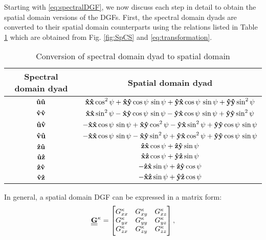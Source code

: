 \documentclass[12pt]{article}
\begin{document}
Starting with \eqref{eq:spectralDGF}, we now discuss each step in detail to obtain the spatial domain versions of the DGFs. First, the spectral domain dyads are converted to their spatial domain counterparts using the relations listed in Table \ref{tab:dyad_conversion} which are obtained from Fig. \ref{fig:SpCS} and \eqref{eq:transformation}.
%
\begin{table}[!ht]
  \begin{center}
    \begin{tabular}{|| c | c ||}
      \hline
      Spectral domain dyad & Spatial domain dyad \\ [0.5ex]
      \hline\hline
      $\mathbf{\hat u} \mathbf{\hat u}$ & $ \displaystyle \mathbf{\hat x} \mathbf{\hat x} \cos^2 \psi + \mathbf{\hat x} \mathbf{\hat y} \cos \psi \, \sin \psi + \mathbf{\hat y} \mathbf{\hat x} \cos \psi \, \sin \psi + \mathbf{\hat y} \mathbf{\hat y} \sin^2 \psi$ \\ [2.5ex]
      $\mathbf{\hat v} \mathbf{\hat v}$ & $ \displaystyle \mathbf{\hat x} \mathbf{\hat x} \sin^2 \psi - \mathbf{\hat x} \mathbf{\hat y} \cos \psi \, \sin \psi - \mathbf{\hat y} \mathbf{\hat x} \cos \psi \, \sin \psi + \mathbf{\hat y} \mathbf{\hat y} \sin^2 \psi$ \\ [2.5ex]
      $\mathbf{\hat u} \mathbf{\hat v}$ & $ \displaystyle -\mathbf{\hat x} \mathbf{\hat x} \cos \psi \, \sin \psi + \mathbf{\hat x} \mathbf{\hat y} \cos^2 \psi - \mathbf{\hat y} \mathbf{\hat x} \sin^2 \psi + \mathbf{\hat y} \mathbf{\hat y} \cos \psi \, \sin \psi$ \\ [2.5ex]
      $\mathbf{\hat v} \mathbf{\hat u}$ & $ \displaystyle -\mathbf{\hat x} \mathbf{\hat x} \cos \psi \, \sin \psi - \mathbf{\hat x} \mathbf{\hat y} \sin^2 \psi + \mathbf{\hat y} \mathbf{\hat x} \cos^2 \psi + \mathbf{\hat y} \mathbf{\hat y} \cos \psi \, \sin \psi$ \\ [2.5ex]
      $\mathbf{\hat z} \mathbf{\hat u}$ & $ \displaystyle \mathbf{\hat z} \mathbf{\hat x} \cos \psi + \mathbf{\hat z} \mathbf{\hat y} \sin \psi$ \\ [2.5ex]
      $\mathbf{\hat u} \mathbf{\hat z}$ & $ \displaystyle \mathbf{\hat x} \mathbf{\hat z} \cos \psi + \mathbf{\hat y} \mathbf{\hat z} \sin \psi$ \\ [2.5ex]
      $\mathbf{\hat z} \mathbf{\hat v}$ & $ \displaystyle -\mathbf{\hat z} \mathbf{\hat x} \sin \psi + \mathbf{\hat z} \mathbf{\hat y} \cos \psi$ \\ [2.5ex]
      $\mathbf{\hat v} \mathbf{\hat z}$ & $ \displaystyle -\mathbf{\hat x} \mathbf{\hat z} \sin \psi + \mathbf{\hat y} \mathbf{\hat z} \cos \psi$ \\ [2.5ex]
      \hline
    \end{tabular}
  \end{center}
  \caption{Conversion of spectral domain dyad to spatial domain}
  \label{tab:dyad_conversion}
\end{table}
%
In general, a spatial domain DGF can be expressed in a matrix form:
%
\begin{equation}
  \underline{\underline{\mathbf{G}}}^\mathrm{\kappa} =
  \begin{bmatrix}
    G_{xx}^\mathrm{\kappa} & G_{xy}^\mathrm{\kappa} & G_{xz}^\mathrm{\kappa} \\
    G_{yx}^\mathrm{\kappa} & G_{yy}^\mathrm{\kappa} & G_{yz}^\mathrm{\kappa} \\
    G_{zx}^\mathrm{\kappa} & G_{zy}^\mathrm{\kappa} & G_{zz}^\mathrm{\kappa} \\
  \end{bmatrix}
  \label{eq:matrix_dyadicG},
\end{equation}
\end{document}
